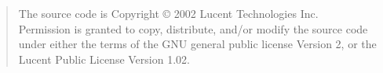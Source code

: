 \begin{quote}
The source code is Copyright \copyright{} 2002 Lucent Technologies Inc.\\
Permission is granted to copy, distribute, and/or modify the source code
under either the terms of the GNU general public license Version 2,
or the Lucent Public License Version 1.02.
\end{quote}
